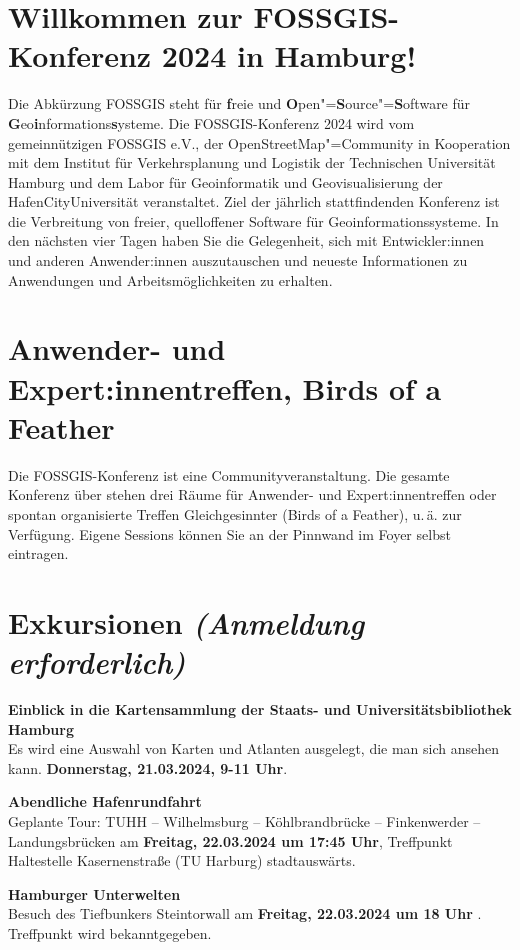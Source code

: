 \newpage
\section*{Willkommen zur FOSSGIS-Konferenz 2024 in Hamburg!}\label{welcome}
Die Abkürzung { FOSSGIS} steht für {\bfseries f}reie und {\bfseries O}pen"={\bfseries S}ource"={\bfseries S}oftware für {\bfseries G}eo{\bfseries i}nformations{\bfseries s}ysteme.
Die FOSSGIS-Konferenz 2024 wird vom gemeinnützigen FOSSGIS e.V., der
OpenStreetMap"=Community in Kooperation mit dem Institut für Verkehrsplanung und Logistik der Technischen Universität Hamburg und dem Labor für Geoinformatik und Geovisualisierung der HafenCityUniversität veranstaltet. 
Ziel der jährlich stattfindenden Konferenz ist die Verbreitung von freier,
quelloffener Software für Geoinformationssysteme. In den nächsten vier Tagen
haben Sie die Gelegenheit, sich mit Entwickler:innen und anderen Anwender:innen
auszutauschen und \mbox{neueste} Informationen zu Anwendungen und
Arbeitsmöglichkeiten zu erhalten.

\section*{Anwender- und Expert:innentreffen, Birds of a Feather}
Die FOSSGIS-Konferenz ist eine Communityveranstaltung.
Die gesamte Konferenz über stehen drei Räume für Anwender- und Expert:innentreffen oder spontan organisierte Treffen Gleichgesinnter (Birds of a Feather), u.\,ä.
zur Verfügung. Eigene Sessions können Sie an der Pinnwand im Foyer selbst eintragen.

\section*{Exkursionen {\normalfont\em (Anmeldung erforderlich)}}\label{exkursionen}
\noindent
{\large \bfseries Einblick in die Kartensammlung der Staats- und Universitätsbibliothek Hamburg}\\
Es wird eine Auswahl von Karten und Atlanten ausgelegt, die man sich ansehen kann. {\bfseries Donnerstag, 21.03.2024, 9-11 Uhr}.
\bigskip

\noindent
{\large \bfseries Abendliche Hafenrundfahrt}\\
Geplante Tour: TUHH – Wilhelmsburg – Köhlbrandbrücke – Finkenwerder – Landungsbrücken am {\bfseries Freitag, 22.03.2024 um 17:45 Uhr}, Treffpunkt Haltestelle Kasernenstraße (TU Harburg) stadtauswärts.
\bigskip

\noindent
{\large \bfseries Hamburger Unterwelten}\\
Besuch des Tiefbunkers Steintorwall am {\bfseries Freitag, 22.03.2024 um 18 Uhr }. Treffpunkt wird bekanntgegeben.
\bigskip

